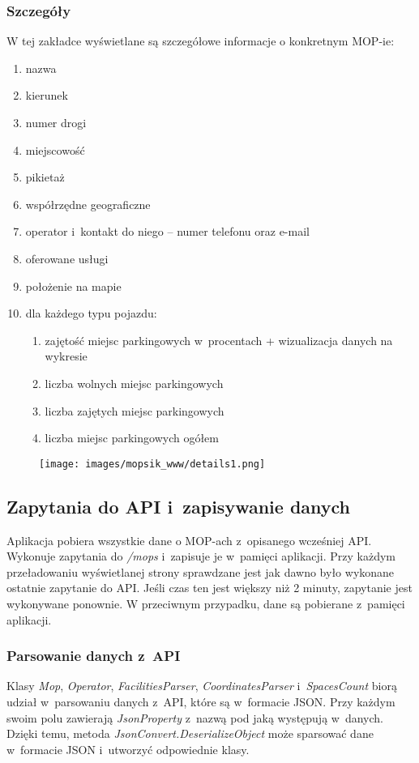 \subsubsection{Szczegóły}
W tej zakładce wyświetlane są szczegółowe informacje o konkretnym MOP-ie:
\begin{enumerate}
\item nazwa
\item kierunek
\item numer drogi
\item miejscowość
\item pikietaż
\item współrzędne geograficzne
\item operator i~kontakt do niego -- numer telefonu oraz e-mail
\item oferowane usługi
\item położenie na mapie
\item dla każdego typu pojazdu:
\begin{enumerate}
\item zajętość miejsc parkingowych w~procentach + wizualizacja danych na wykresie
\item liczba wolnych miejsc parkingowych
\item liczba zajętych miejsc parkingowych
\item liczba miejsc parkingowych ogółem
\end{enumerate}
\end{enumerate}

\begin{figure}[!htb]
\centering
\texttt{[image: images/mopsik\_www/details1.png]}
\label{mopsik_www_details}
\end{figure}

\subsection{Zapytania do API i~zapisywanie danych}
Aplikacja pobiera wszystkie dane o MOP-ach z~opisanego wcześniej API. Wykonuje zapytania do \textit{/mops} i~zapisuje je w~pamięci aplikacji. Przy każdym przeładowaniu wyświetlanej strony sprawdzane jest jak dawno było wykonane ostatnie zapytanie do API. Jeśli czas ten jest większy niż 2 minuty, zapytanie jest wykonywane ponownie. W przeciwnym przypadku, dane są pobierane z~pamięci aplikacji.

\subsubsection{Parsowanie danych z~API}
Klasy \textit{Mop}, \textit{Operator}, \textit{FacilitiesParser}, \textit{CoordinatesParser} i~\textit{SpacesCount} biorą udział w~parsowaniu danych z~API, które są w~formacie JSON. Przy każdym swoim polu zawierają \textit{JsonProperty} z~nazwą pod jaką występują w~danych. Dzięki temu, metoda \textit{JsonConvert.DeserializeObject} może sparsować dane w~formacie JSON i~utworzyć odpowiednie klasy.

